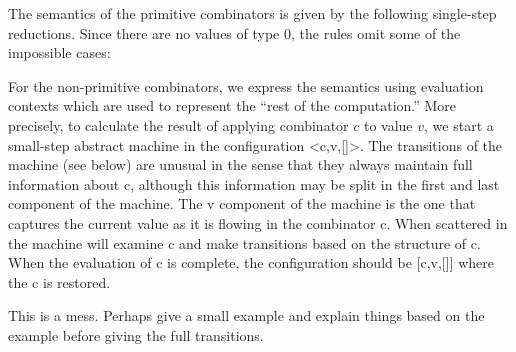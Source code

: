 \documentclass[preprint]{sigplanconf}
\begin{document}
The semantics of the primitive combinators is given by the following
single-step reductions. Since there are no values of type {{0}}, the rules
omit some of the impossible cases:
\begin{scriptsize}
\end{scriptsize}

For the non-primitive combinators, we express the semantics using evaluation
contexts which are used to represent the ``rest of the computation.'' More
precisely, to calculate the result of applying combinator $c$ to value $v$,
we start a small-step abstract machine in the configuration {{<c,v,[]>}}. The
transitions of the machine (see below) are unusual in the sense that they
always maintain full information about {{c}}, although this information may
be split in the first and last component of the machine. The {{v}} component
of the machine is the one that captures the current value as it is flowing in
the combinator {{c}}. When  scattered in the machine will examine {{c}} and make
transitions based on the structure of {{c}}. When the evaluation of {{c}} is
complete, the configuration should be {{[c,v,[]]}} where the {{c}} is
restored.

This is a mess. Perhaps give a small example and explain things based on the
example before giving the full transitions.




\end{document}
